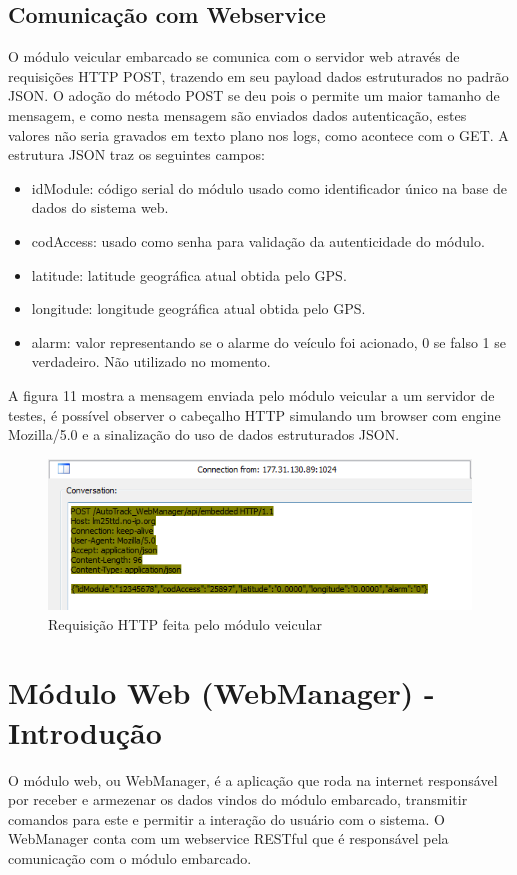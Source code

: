 \subsection{Comunicação com Webservice}

O módulo veicular embarcado se comunica com o servidor web através de requisições HTTP POST, trazendo em seu
payload dados estruturados no padrão JSON. O adoção do método POST se deu pois o permite um maior tamanho de
mensagem, e como nesta mensagem são enviados dados autenticação, estes valores não seria gravados em texto
plano nos logs, como acontece com o GET. A estrutura JSON traz os seguintes campos:

\begin{itemize}
	\item idModule: código serial do módulo usado como identificador único na base de dados do sistema web.
	\item codAccess: usado como senha para validação da autenticidade do módulo.
	\item latitude: latitude geográfica atual obtida pelo GPS.
	\item longitude: longitude geográfica atual obtida pelo GPS.
	\item alarm: valor representando se o alarme do veículo foi acionado, 0 se falso 1 se verdadeiro. Não utilizado no momento.
\end{itemize}

A figura 11 mostra a mensagem enviada pelo módulo veicular a um servidor de testes, é possível observer o cabeçalho HTTP simulando um browser com engine Mozilla/5.0 e a sinalização do uso de dados estruturados JSON.


\begin{figure}[!htb]
	\centering
	\includegraphics[width=7.00cm\textwidth]{figures/requisicao_post.png}
	\caption{Requisição HTTP feita pelo módulo veicular}
	\label{Figura 11}
\end{figure}

\section{Módulo Web (WebManager) - Introdução}

O módulo web, ou WebManager, é a aplicação que roda na internet responsável por receber e armezenar os dados vindos do módulo embarcado, transmitir comandos para este e permitir a interação do usuário com o sistema. O WebManager conta com um webservice RESTful que é responsável pela comunicação com o módulo embarcado.


